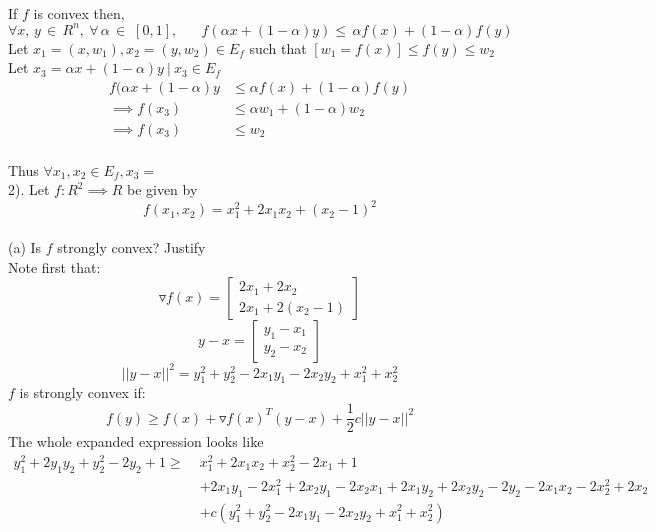 \documentclass[12pt,letterpaper]{article}
\begin{document}
\vspace{10pt}\\
If $f$ is convex then, $\forall x,\, y\, \in\, R^n,\: \forall\, \alpha\, \in\; [0,1],\hspace{20pt} f(\alpha x + (1-\alpha) y) \le\, \alpha f(x) + (1-\alpha) f(y) $
Let $x_1 = (x, w_1), x_2 = (y, w_2) \in E_f$ such that $[w_1 = f(x)] \le f(y) \le w_2$\\
Let $x_3 = \alpha x + (1-\alpha) y \:|\: x_3\in E_f$
\begin{equation*}
    \begin{split}
        f(\alpha x + (1-\alpha) y &\le \alpha f(x) + (1-\alpha)f(y)
        \\
        \implies f(x_3) &\le \alpha w_1 + (1-\alpha)w_2
        \\
        \implies f(x_3) &\le w_2
    \end{split}
\end{equation*}
\\
Thus $\forall x_1, x_2 \in E_f, x_3 = $
\vspace{10pt}
\\
2). Let $f: R^2 \implies R$ be given by 
\[ f(x_1, x_2) = x_1^2 + 2x_1 x_2 + (x_2-1)^2\]
\\
(a) Is $f$ strongly convex? Justify
\vspace{10pt}\\
Note first that:
\[\triangledown f(x) = 
\begin{bmatrix}
2x_1 + 2x_2
\\
2x_1 + 2(x_2 - 1)
\end{bmatrix}\]
\[y-x = \begin{bmatrix}
y_1 - x_1
\\
y_2 - x_2
\end{bmatrix} \]
\[||y-x||^2 = y_1^2 + y_2^2 -2x_1y_1 - 2x_2y_2 + x_1^2 + x_2^2\]
$f$ is strongly convex if:
\[ f(y) \ge f(x) + \triangledown f(x)^T(y-x) + \frac{1}{2}c||y-x||^2\]
The whole expanded expression looks like
\begin{equation*}
    \begin{split}
        y_1^2 + 2 y_1 y_2 + y_2^2 -2y_2 + 1 \ge\; &x_1^2 + 2x_1 x_2 + x_2^2 - 2x_1 + 1 
        \\
        &+ 2x_1y_1 - 2x_1^2 + 2x_2 y_1 - 2 x_2 x_1 + 2 x_1 y_2 + 2x_2 y_2 - 2y_2 - 2x_1 x_2 - 2x_2^2 + 2x_2
        \\
        &+ c(y_1^2 + y_2^2 -2x_1y_1 - 2x_2y_2 + x_1^2 + x_2^2)
    \end{split}
\end{equation*}
\end{document}
